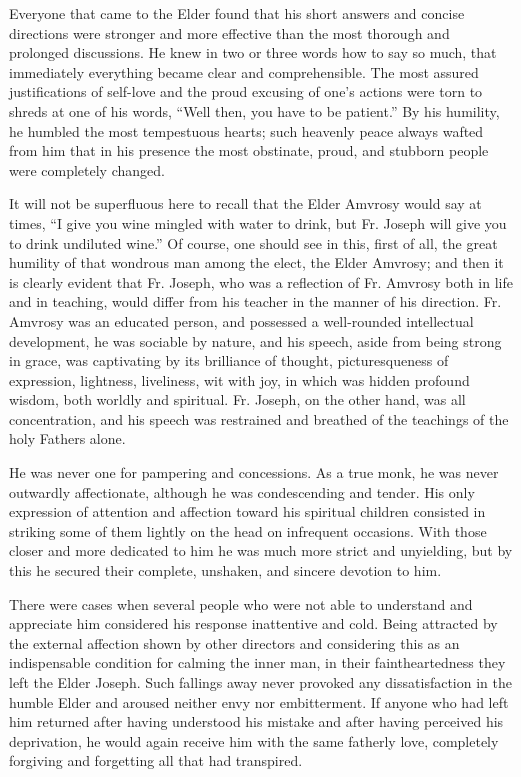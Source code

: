 Everyone that came to the Elder found that his short answers and concise directions were stronger and more effective than the most thorough and prolonged discussions. He knew in two or three words how to say so much, that immediately everything became clear and comprehensible. The most assured justifications of self-love and the proud excusing of one's actions were torn to shreds at one of his words, ``Well then, you have to be patient.'' By his humility, he humbled the most tempestuous hearts; such heavenly peace always wafted from him that in his presence the most obstinate, proud, and stubborn people were completely changed.

It will not be superfluous here to recall that the Elder Amvrosy would say at times, ``I give you wine mingled with water to drink, but Fr. Joseph will give you to drink undiluted wine.'' Of course, one should see in this, first of all, the great humility of that wondrous man among the elect, the Elder Amvrosy; and then it is clearly evident that Fr. Joseph, who was a reflection of Fr. Amvrosy both in life and in teaching, would differ from his teacher in the manner of his direction. Fr. Amvrosy was an educated person, and possessed a well-rounded intellectual development, he was sociable by nature, and his speech, aside from being strong in grace, was captivating by its brilliance of thought, picturesqueness of expression, lightness, liveliness, wit with joy, in which was hidden profound wisdom, both worldly and spiritual. Fr. Joseph, on the other hand, was all concentration, and his speech was restrained and breathed of the teachings of the holy Fathers alone.

He was never one for pampering and concessions. As a true monk, he was never outwardly affectionate, although he was condescending and tender. His only expression of attention and affection toward his spiritual children consisted in striking some of them lightly on the head on infrequent occasions. With those closer and more dedicated to him he was much more strict and unyielding, but by this he secured their complete, unshaken, and sincere devotion to him.

There were cases when several people who were not able to understand and appreciate him considered his response inattentive and cold. Being attracted by the external affection shown by other directors and considering this as an indispensable condition for calming the inner man, in their faintheartedness they left the Elder Joseph. Such fallings away never provoked any dissatisfaction in the humble Elder and aroused neither envy nor embitterment. If anyone who had left him returned after having understood his mistake and after having perceived his deprivation, he would again receive him with the same fatherly love, completely forgiving and forgetting all that had transpired.

